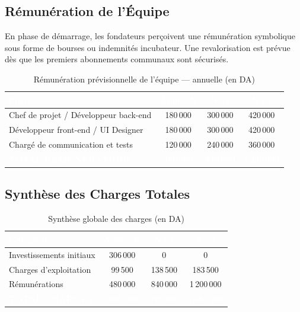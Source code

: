\documentclass[12pt,a4paper]{report}
\newcommand{\thdcell}[1]{%
  \cellcolor{tabhead}\textbf{\textcolor{white}{#1}}%
}
\begin{document}
\subsection{Rémunération de l'Équipe}

En phase de démarrage, les fondateurs perçoivent une rémunération symbolique
sous forme de bourses ou indemnités incubateur. Une revalorisation est prévue
dès que les premiers abonnements communaux sont sécurisés.

\begin{table}[H]
  \centering
  \caption{Rémunération prévisionnelle de l'équipe — annuelle (en DA)}
  \renewcommand{\arraystretch}{1.4}
  \begin{tabularx}{\linewidth}{Xccc}
    \toprule
    \rowcolor{primary}
    \thdcell{Poste} & \thdcell{Année N} & \thdcell{N+1} & \thdcell{N+2} \\
    \midrule

    Chef de projet / Développeur back-end  & 180\,000 & 300\,000 & 420\,000 \\
    \rowcolor{lightgray}
    Développeur front-end / UI Designer    & 180\,000 & 300\,000 & 420\,000 \\
    Chargé de communication et tests       & 120\,000 & 240\,000 & 360\,000 \\
    \midrule
    \rowcolor{primary}
    \textcolor{white}{\textbf{TOTAL RÉMUNÉRATIONS}} &
    \textcolor{white}{\textbf{480\,000}} &
    \textcolor{white}{\textbf{840\,000}} &
    \textcolor{white}{\textbf{1\,200\,000}} \\
    \bottomrule
  \end{tabularx}
\end{table}

\subsection{Synthèse des Charges Totales}

\begin{table}[H]
  \centering
  \caption{Synthèse globale des charges (en DA)}
  \renewcommand{\arraystretch}{1.4}
  \begin{tabularx}{\linewidth}{Xccc}
    \toprule
    \rowcolor{primary}
    \thdcell{Catégorie} & \thdcell{Année N} & \thdcell{N+1} & \thdcell{N+2} \\
    \midrule

    Investissements initiaux    & 306\,000 &       0 &         0 \\
    \rowcolor{lightgray}
    Charges d'exploitation      &  99\,500 & 138\,500 & 183\,500 \\
    Rémunérations               & 480\,000 & 840\,000 & 1\,200\,000 \\
    \midrule
    \rowcolor{primary}
    \textcolor{white}{\textbf{TOTAL CHARGES}} &
    \textcolor{white}{\textbf{885\,500}} &
    \textcolor{white}{\textbf{978\,500}} &
    \textcolor{white}{\textbf{1\,383\,500}} \\
    \bottomrule
  \end{tabularx}
\end{table}
\end{document}
